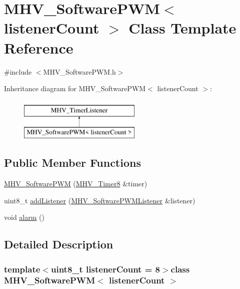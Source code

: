 \hypertarget{class_m_h_v___software_p_w_m}{
\section{\-M\-H\-V\-\_\-\-Software\-P\-W\-M$<$ listener\-Count $>$ \-Class \-Template \-Reference}
\label{class_m_h_v___software_p_w_m}
}


{\ttfamily \#include $<$\-M\-H\-V\-\_\-\-Software\-P\-W\-M.\-h$>$}

\-Inheritance diagram for \-M\-H\-V\-\_\-\-Software\-P\-W\-M$<$ listener\-Count $>$\-:\begin{figure}[H]
\begin{center}
\leavevmode
\includegraphics[height=2.000000cm]{class_m_h_v___software_p_w_m}
\end{center}
\end{figure}
\subsection*{\-Public \-Member \-Functions}
\begin{DoxyCompactItemize}
\item 
\hyperlink{class_m_h_v___software_p_w_m_a65864e875328fc49fd30016c3cdd4549}{\-M\-H\-V\-\_\-\-Software\-P\-W\-M} (\hyperlink{class_m_h_v___timer8}{\-M\-H\-V\-\_\-\-Timer8} \&timer)
\item 
uint8\-\_\-t \hyperlink{class_m_h_v___software_p_w_m_aa9eb0a661aca583e20de5705a2538cfe}{add\-Listener} (\hyperlink{class_m_h_v___software_p_w_m_listener}{\-M\-H\-V\-\_\-\-Software\-P\-W\-M\-Listener} \&listener)
\item 
void \hyperlink{class_m_h_v___software_p_w_m_aef021dedf117628a95ff35eb2e0af0b0}{alarm} ()
\end{DoxyCompactItemize}


\subsection{\-Detailed \-Description}
\subsubsection*{template$<$uint8\-\_\-t listener\-Count = 8$>$class M\-H\-V\-\_\-\-Software\-P\-W\-M$<$ listener\-Count $>$}



